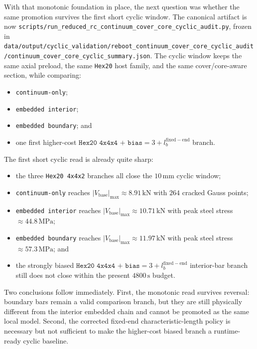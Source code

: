 With that monotonic foundation in place, the next question was whether the same
promotion survives the first short cyclic window. The canonical artifact is now
\texttt{scripts/run\_reduced\_rc\_continuum\_cover\_core\_cyclic\_audit.py},
frozen in
\texttt{data/output/cyclic\_validation/reboot\_continuum\_cover\_core\_cyclic\_audit/continuum\_cover\_core\_cyclic\_summary.json}.
The cyclic window keeps the same axial preload, the same \texttt{Hex20} host
family, and the same cover/core-aware section, while comparing:
\begin{itemize}
  \item \texttt{continuum-only};
  \item \texttt{embedded interior};
  \item \texttt{embedded boundary}; and
  \item one first higher-cost
    \(\texttt{Hex20 4x4x4 + bias}=3 + l_b^{\mathrm{fixed-end}}\) branch.
\end{itemize}

The first short cyclic read is already quite sharp:
\begin{itemize}
  \item the three \texttt{Hex20 4x4x2} branches all close the
    \(10\,\mathrm{mm}\) cyclic window;
  \item \texttt{continuum-only} reaches
    \(|V_{\mathrm{base}}|_{\max} \approx 8.91\,\mathrm{kN}\) with
    \(264\) cracked Gauss points;
  \item \texttt{embedded interior} reaches
    \(|V_{\mathrm{base}}|_{\max} \approx 10.71\,\mathrm{kN}\) with peak steel
    stress \(\approx 44.8\,\mathrm{MPa}\);
  \item \texttt{embedded boundary} reaches
    \(|V_{\mathrm{base}}|_{\max} \approx 11.97\,\mathrm{kN}\) with peak steel
    stress \(\approx 57.3\,\mathrm{MPa}\); and
  \item the strongly biased
    \(\texttt{Hex20 4x4x4 + bias}=3 + l_b^{\mathrm{fixed-end}}\) interior-bar
    branch still does not close within the present \(4800\,\mathrm{s}\) budget.
\end{itemize}

Two conclusions follow immediately. First, the monotonic read survives
reversal: boundary bars remain a valid comparison branch, but they are still
physically different from the interior embedded chain and cannot be promoted as
the same local model. Second, the corrected fixed-end characteristic-length
policy is necessary but not sufficient to make the higher-cost biased branch a
runtime-ready cyclic baseline.

